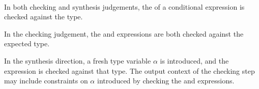 
\begin{Syntax}
	 \\
           \code{:} 
\end{Syntax}

\begin{Checking}
	\vspace{1em}
\end{Checking}

\begin{Description}
In both checking and synthesis judgements, the  of a conditional expression is checked against the  type.

In the checking judgement, the  and  expressions are both checked against the expected type.
\end{Description}

\begin{Checking}
\end{Checking}

\begin{Description}
In the synthesis direction, a fresh type variable $\alpha$ is introduced, and the expression is checked against that type.
The output context \ContextVarB of the checking step may include constraints on $\alpha$ introduced by checking the  and  expressions.
\end{Description}
